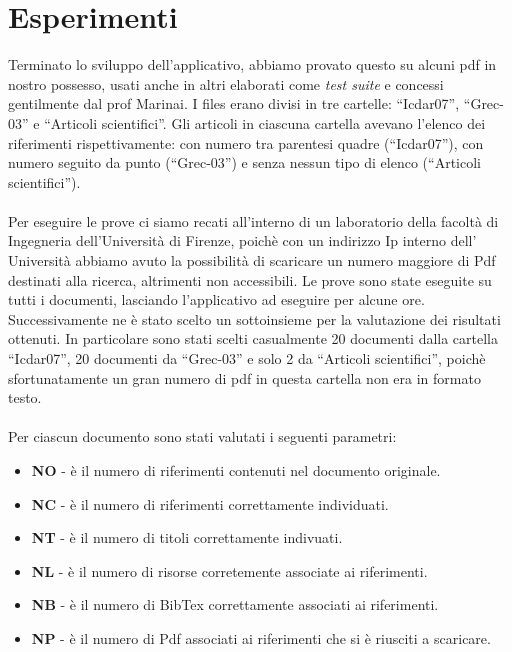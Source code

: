 \section{Esperimenti} \label{esperimenti}
Terminato lo sviluppo dell'applicativo, abbiamo provato questo su alcuni pdf in nostro possesso, usati anche in altri elaborati come \textit{test suite} e concessi gentilmente dal prof Marinai.  I files erano divisi in tre cartelle: ``Icdar07'', ``Grec-03'' e ``Articoli scientifici''. Gli articoli in ciascuna cartella avevano l'elenco dei riferimenti rispettivamente: con numero tra parentesi quadre (``Icdar07''), con numero seguito da punto (``Grec-03'') e senza nessun tipo di elenco (``Articoli scientifici''). 
\\~\\
Per eseguire le prove ci siamo recati all'interno di un laboratorio della facoltà di Ingegneria dell'Università di Firenze, poichè con un indirizzo Ip interno dell' Università abbiamo avuto la possibilità di scaricare un numero maggiore di Pdf destinati alla ricerca, altrimenti non accessibili.
Le prove sono state eseguite su tutti i documenti, lasciando l'applicativo ad eseguire per alcune ore. Successivamente ne è stato scelto un sottoinsieme per la valutazione dei risultati ottenuti. In particolare sono stati scelti casualmente 20 documenti dalla cartella ``Icdar07'', 20 documenti da ``Grec-03'' e solo 2 da ``Articoli scientifici'', poichè sfortunatamente un gran numero di pdf in questa cartella non era in formato testo.
\\~\\
Per ciascun documento sono stati valutati i seguenti parametri:
\begin{itemize}
 \item \textbf{NO} - è il numero di riferimenti contenuti nel documento originale.
 \item \textbf{NC} - è il numero di riferimenti correttamente individuati. 
 \item \textbf{NT} - è il numero di titoli correttamente indivuati.
 \item \textbf{NL} - è il numero di risorse corretemente associate ai riferimenti.
 \item \textbf{NB} - è il numero di BibTex correttamente associati ai riferimenti.
 \item \textbf{NP} - è il numero di Pdf associati ai riferimenti che si è riusciti a scaricare. 
\end{itemize}


